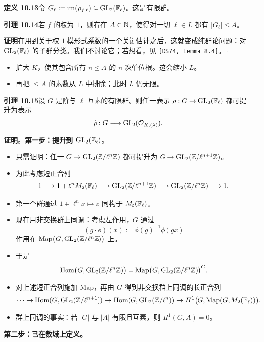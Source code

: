 \noindent\textbf{定义 10.13}\label{def:10.13}\quad 令 $G_\ell:=\operatorname{im}(\rho_{f,\ell})\subseteq\operatorname{GL}_2(\mathbb{F}_\ell)$。这是有限群。

\noindent\textbf{引理 10.14}\label{lem:10.14}\quad 若 $f$ 的权为 $1$，则存在 $A\in\mathbb{N}$，使得对一切 $\ell\in L$ 都有 $|G_\ell|\le A$。

\noindent\textbf{证明}\quad 在用到关于权 $1$ 模形式系数的一个关键估计之后，这就变成纯群论问题：对 $\operatorname{GL}_2(\mathbb{F}_\ell)$ 的子群分类。我们不讨论它；若想看，见 \texttt{[DS74, Lemma 8.4]}。\hfill$\square$

\begin{itemize}
\item 扩大 $K$，使其包含所有 $n\le A$ 的 $n$ 次单位根。这会缩小 $L$。
\item 再把 $\le A$ 的素数从 $L$ 中排除；此时 $L$ 仍无限。
\end{itemize}

\noindent\textbf{引理 10.15}\label{lem:10.15}\quad 设 $G$ 是阶与 $\ell$ 互素的有限群。则任一表示 $\rho:G\to\operatorname{GL}_2(\mathbb{F}_\ell)$ 都可提升为表示
\[
\tilde\rho:G\longrightarrow\operatorname{GL}_2(\mathcal{O}_{K,(\lambda)}).
\]

\noindent\textbf{证明}。\textbf{第一步：提升到 $\operatorname{GL}_2(\mathbb{Z}_\ell)$}。

\begin{itemize}
\item 只需证明：任一 $G\to\operatorname{GL}_2(\mathbb{Z}/\ell^n\mathbb{Z})$ 都可提升为 $G\to\operatorname{GL}_2(\mathbb{Z}/\ell^{n+1}\mathbb{Z})$。
\item 为此考虑短正合列
\[
1\longrightarrow 1+\ell^nM_2(\mathbb{F}_\ell)\longrightarrow\operatorname{GL}_2(\mathbb{Z}/\ell^{n+1}\mathbb{Z})\longrightarrow\operatorname{GL}_2(\mathbb{Z}/\ell^n\mathbb{Z})\longrightarrow 1.
\]
\item 第一个群通过 $1+\ell^nx\mapsto x$ 同构于 $M_2(\mathbb{F}_\ell)$。
\item 现在用非交换群上同调：考虑左作用，$G$ 通过
\[
(g\cdot\phi)(x):=\phi(g)^{-1}\phi(gx)
\]
作用在 $\mathrm{Map}\bigl(G,\operatorname{GL}_2(\mathbb{Z}/\ell^n\mathbb{Z})\bigr)$ 上。
\item 于是
\[
\operatorname{Hom}\bigl(G,\operatorname{GL}_2(\mathbb{Z}/\ell^n\mathbb{Z})\bigr)=\mathrm{Map}\bigl(G,\operatorname{GL}_2(\mathbb{Z}/\ell^n\mathbb{Z})\bigr)^G.
\]
\item 对上述短正合列施加 $\mathrm{Map}$，再由 $G$ 得到非交换群上同调的长正合列
\[
\cdots\to\operatorname{Hom}(G,\operatorname{GL}_2(\mathbb{Z}/\ell^{n+1}))\to\operatorname{Hom}(G,\operatorname{GL}_2(\mathbb{Z}/\ell^n))\to H^1\bigl(G,\mathrm{Map}(G,M_2(\mathbb{F}_\ell))\bigr).
\]
\item 群上同调的事实：若 $|G|$ 与 $|A|$ 有限且互素，则 $H^1(G,A)=0$。
\end{itemize}
\noindent\textbf{第二步：已在数域上定义。}

